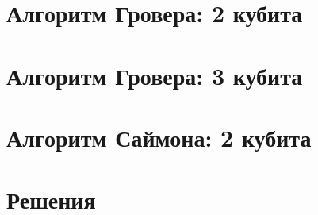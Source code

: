 \documentclass[12pt]{article}
\newcounter{problem}[section]
\begin{document}
\section{Алгоритм Гровера: 2 кубита}

\section{Алгоритм Гровера: 3 кубита}

\section{Алгоритм Саймона: 2 кубита}



\renewenvironment{solution}[1]{%
         \vskip .5cm plus 2cm minus 0.1cm%
         {\bfseries \hyperlink{problem:#1}{#1.}}%
}%
{%
}%

\section{Решения}

\end{document}
